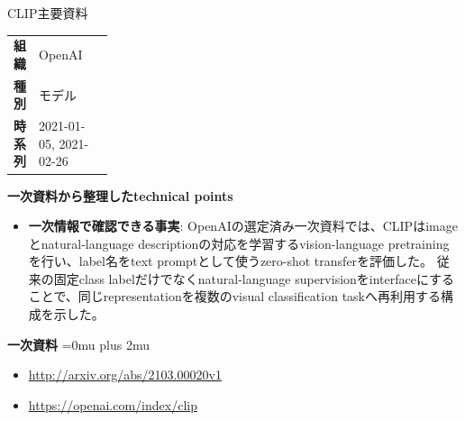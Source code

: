 \begin{technicalnote}{CLIP}{主要資料}
\begingroup
\begin{tabularx}{\linewidth}{@{}>{\bfseries}p{0.22\linewidth}X@{}}
組織 & OpenAI \\
種別 & モデル \\
時系列 & 2021-01-05, 2021-02-26 \\
\end{tabularx}
\smallskip
\begin{minipage}{\linewidth}
{\bfseries 一次資料から整理したtechnical points}
\begin{itemize}[leftmargin=1.5em,itemsep=0.35em]
\item \textbf{一次情報で確認できる事実}: OpenAIの選定済み一次資料では、CLIPはimageとnatural-language descriptionの対応を学習するvision-language pretrainingを行い、label名をtext promptとして使うzero-shot transferを評価した。 従来の固定class labelだけでなくnatural-language supervisionをinterfaceにすることで、同じrepresentationを複数のvisual classification taskへ再利用する構成を示した。
\end{itemize}
\begin{minipage}{\linewidth}
\begin{samepage}
{\bfseries 一次資料}
\begingroup\sloppy
\Urlmuskip=0mu plus 2mu\relax
\begin{itemize}[leftmargin=1.5em,itemsep=0.25em]
\item {\scriptsize\url{http://arxiv.org/abs/2103.00020v1}}
\item {\scriptsize\url{https://openai.com/index/clip}}
\end{itemize}
\endgroup
\end{samepage}
\end{minipage}
\end{minipage}
\endgroup
\end{technicalnote}
\medskip

